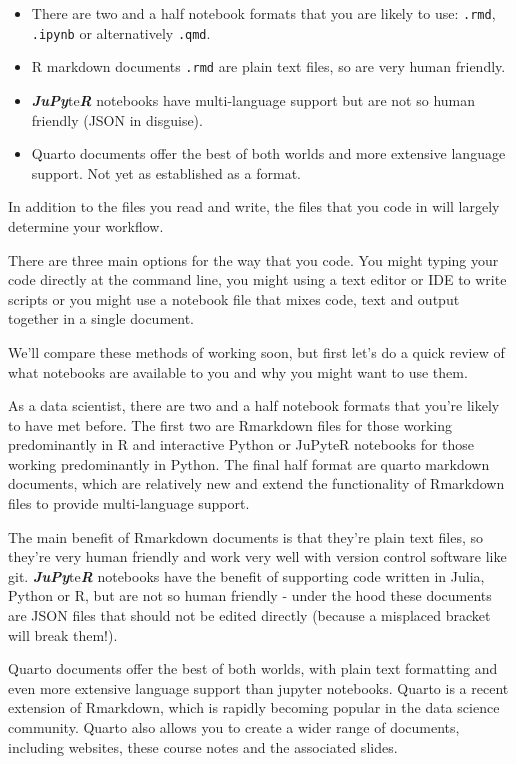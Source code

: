 \documentclass[
  letterpaper,
  DIV=11,
  numbers=noendperiod]{scrreprt}
\begin{document}
\begin{itemize}
\item
  There are two and a half notebook formats that you are likely to use:
  \texttt{.rmd}, \texttt{.ipynb} or alternatively \texttt{.qmd}.
\item
  R markdown documents \texttt{.rmd} are plain text files, so are very
  human friendly.
\item
  \textbf{\emph{JuPy}}te\textbf{\emph{R}} notebooks have multi-language
  support but are not so human friendly (JSON in disguise).
\item
  Quarto documents offer the best of both worlds and more extensive
  language support. Not yet as established as a format.
\end{itemize}

In addition to the files you read and write, the files that you code in
will largely determine your workflow.

There are three main options for the way that you code. You might typing
your code directly at the command line, you might using a text editor or
IDE to write scripts or you might use a notebook file that mixes code,
text and output together in a single document.

We'll compare these methods of working soon, but first let's do a quick
review of what notebooks are available to you and why you might want to
use them.

As a data scientist, there are two and a half notebook formats that
you're likely to have met before. The first two are Rmarkdown files for
those working predominantly in R and interactive Python or JuPyteR
notebooks for those working predominantly in Python. The final half
format are quarto markdown documents, which are relatively new and
extend the functionality of Rmarkdown files to provide multi-language
support.

The main benefit of Rmarkdown documents is that they're plain text
files, so they're very human friendly and work very well with version
control software like git. \textbf{\emph{JuPy}}te\textbf{\emph{R}}
notebooks have the benefit of supporting code written in Julia, Python
or R, but are not so human friendly - under the hood these documents are
JSON files that should not be edited directly (because a misplaced
bracket will break them!).

Quarto documents offer the best of both worlds, with plain text
formatting and even more extensive language support than jupyter
notebooks. Quarto is a recent extension of Rmarkdown, which is rapidly
becoming popular in the data science community. Quarto also allows you
to create a wider range of documents, including websites, these course
notes and the associated slides.
\end{document}
